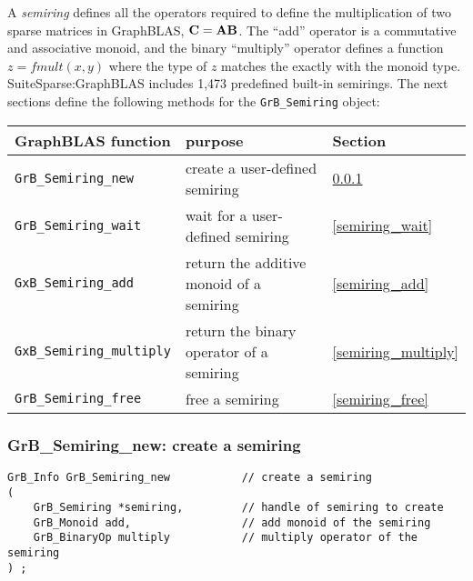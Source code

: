 \documentclass[12pt]{article}
\begin{document}
{A {\em semiring} defines all the operators required to define the
multiplication of two sparse matrices in GraphBLAS, ${\bf C=AB}$.  The ``add''
operator is a commutative and associative monoid, and the binary ``multiply''
operator defines a function $z=fmult(x,y)$ where the type of $z$ matches the
exactly with the monoid type.  SuiteSparse:GraphBLAS includes 1,473 predefined
built-in semirings.  The next sections define the following methods for the
\verb'GrB_Semiring' object:

\vspace{0.2in}
{\footnotesize
\begin{tabular}{lll}
\hline
GraphBLAS function   & purpose                                      & Section \\
\hline
\verb'GrB_Semiring_new'       & create a user-defined semiring           & \ref{semiring_new} \\
\verb'GrB_Semiring_wait'      & wait for a user-defined semiring         & \ref{semiring_wait} \\
\verb'GxB_Semiring_add'       & return the additive monoid of a semiring & \ref{semiring_add} \\
\verb'GxB_Semiring_multiply'  & return the binary operator of a semiring & \ref{semiring_multiply} \\
\verb'GrB_Semiring_free'      & free a semiring                          & \ref{semiring_free} \\
\hline
\end{tabular}
}

\subsubsection{{\sf GrB\_Semiring\_new:} create a semiring}
\label{semiring_new}

\begin{mdframed}[userdefinedwidth=6in]
{\footnotesize
\begin{verbatim}
GrB_Info GrB_Semiring_new           // create a semiring
(
    GrB_Semiring *semiring,         // handle of semiring to create
    GrB_Monoid add,                 // add monoid of the semiring
    GrB_BinaryOp multiply           // multiply operator of the semiring
) ;
\end{verbatim}
} \end{mdframed}

}
\end{document}
